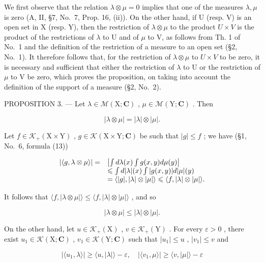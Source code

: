We first observe that the relation \(\lambda \otimes \mu = 0\) implies that one of the measures \(\lambda, \mu\) is zero (A, II, §7, No.~7, Prop. 16, (ii)). On the other hand, if U (resp. V) is an open set in X (resp. Y), then the restriction of \(\lambda\otimes\mu\) to the product \(U\times V\) is the product of the restrictions of \(\lambda\) to U and of \(\mu\) to V, as follows from Th. 1 of No.~1 and the definition of the restriction of a measure to an open set (§2, No.~1). It therefore follows that, for the restriction of \(\lambda\otimes\mu\) to \(U\times V\) to be zero, it is necessary and sufficient that either the restriction of \(\lambda\) to U or the restriction of \(\mu\) to V be zero, which proves the proposition, on taking into account the definition of the support of a measure (§2, No.~2).

PROPOSITION 3. --- Let \(\lambda \in \mathcal{M}(\mathrm{X};\mathbf{C})\) , \(\mu \in \mathcal{M}(\mathrm{Y};\mathbf{C})\) . Then

\[
| \lambda \otimes \mu | = | \lambda | \otimes | \mu |.\tag{7}
\]

Let \(f \in \mathcal{K}_{+}(\mathrm{X} \times \mathrm{Y})\) , \(g \in \mathcal{K}(\mathrm{X} \times \mathrm{Y}; \mathbf{C})\) be such that \(|g| \leqslant f\) ; we have (§1, No.~6, formula (13))

\[
\begin{array}{r l} | \langle g, \lambda \otimes \mu \rangle | = & \left| \int d \lambda (x) \int g (x, y)   d \mu (y) \right| \\ & \leqslant \int d | \lambda | (x) \int | g (x, y) |   d | \mu | (y) \\ & = \langle | g |, | \lambda | \otimes | \mu | \rangle \leqslant \langle f, | \lambda | \otimes | \mu | \rangle . \end{array}
\]

It follows that \(\langle f, |\lambda \otimes \mu| \rangle \leqslant \langle f, |\lambda| \otimes |\mu| \rangle\) , and so

\[
| \lambda \otimes \mu | \leqslant | \lambda | \otimes | \mu |.\tag{8}
\]

On the other hand, let \(u \in \mathcal{K}_{+}(\mathrm{X})\) , \(v \in \mathcal{K}_{+}(\mathrm{Y})\) . For every \(\varepsilon > 0\) , there exist \(u_{1} \in \mathcal{K}(\mathrm{X};\mathbf{C})\) , \(v_{1} \in \mathcal{K}(\mathrm{Y};\mathbf{C})\) such that \(|u_{1}| \leqslant u\) , \(|v_{1}| \leqslant v\) and

\[
| \langle u _ {1}, \lambda \rangle | \geqslant \langle u, | \lambda | \rangle - \varepsilon , \quad | \langle v _ {1}, \mu \rangle | \geqslant \langle v, | \mu | \rangle - \varepsilon
\]

